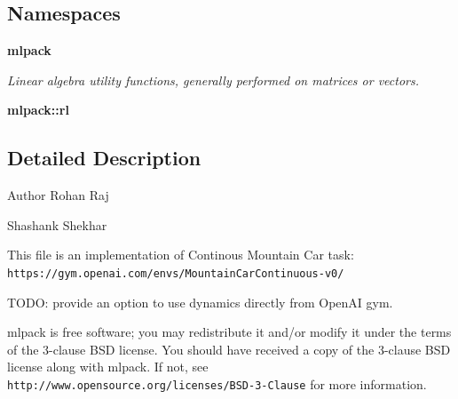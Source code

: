 \subsection*{Namespaces}
\begin{DoxyCompactItemize}
\item 
 \textbf{ mlpack}
\begin{DoxyCompactList}\small\item\em Linear algebra utility functions, generally performed on matrices or vectors. \end{DoxyCompactList}\item 
 \textbf{ mlpack\+::rl}
\end{DoxyCompactItemize}


\subsection{Detailed Description}
\begin{DoxyAuthor}{Author}
Rohan Raj 

Shashank Shekhar
\end{DoxyAuthor}
This file is an implementation of Continous Mountain Car task\+: {\tt https\+://gym.\+openai.\+com/envs/\+Mountain\+Car\+Continuous-\/v0/}

T\+O\+DO\+: provide an option to use dynamics directly from Open\+AI gym.

mlpack is free software; you may redistribute it and/or modify it under the terms of the 3-\/clause B\+SD license. You should have received a copy of the 3-\/clause B\+SD license along with mlpack. If not, see {\tt http\+://www.\+opensource.\+org/licenses/\+B\+S\+D-\/3-\/\+Clause} for more information. 